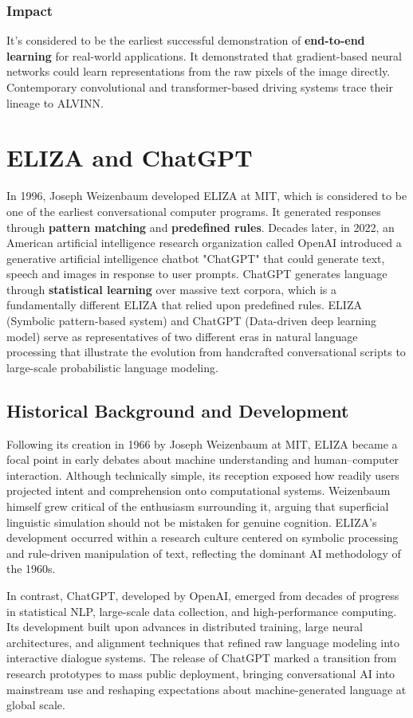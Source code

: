 \documentclass[11pt,a4paper]{report}
\begin{document}
\subsubsection{Impact}
It's considered to be the earliest successful demonstration of \textbf{end-to-end learning} for real-world applications.
It demonstrated that gradient-based neural networks could learn representations from the raw pixels of
the image directly. Contemporary convolutional and transformer-based driving systems trace their lineage to 
ALVINN.

\section{ELIZA and ChatGPT}
In 1996, Joseph Weizenbaum developed ELIZA at MIT, which is considered to be one of the earliest conversational
computer programs. It generated responses through \textbf{pattern matching} and \textbf{predefined rules}. Decades later,
in 2022, an American artificial intelligence research organization called OpenAI introduced a generative 
artificial intelligence chatbot "ChatGPT" that could generate text, speech and images in response to user prompts.
ChatGPT generates language through \textbf{statistical learning} over massive text corpora, which is a fundamentally
different ELIZA that relied upon predefined rules. ELIZA (Symbolic pattern-based system) and ChatGPT (Data-driven deep learning model) 
serve as representatives of two different eras in natural language processing that illustrate the evolution from 
handcrafted conversational scripts to large-scale probabilistic language modeling.

\subsection{Historical Background and Development}
Following its creation in 1966 by Joseph Weizenbaum at MIT, ELIZA became a focal point in early debates about machine 
understanding and human–computer interaction. Although technically simple, its reception exposed how readily users 
projected intent and comprehension onto computational systems. Weizenbaum himself grew critical of the enthusiasm 
surrounding it, arguing that superficial linguistic simulation should not be mistaken for genuine cognition. ELIZA’s 
development occurred within a research culture centered on symbolic processing and rule-driven manipulation of text, 
reflecting the dominant AI methodology of the 1960s.

In contrast, ChatGPT, developed by OpenAI, emerged from decades of progress in statistical NLP, large-scale data collection, 
and high-performance computing. Its development built upon advances in distributed training, large neural architectures, 
and alignment techniques that refined raw language modeling into interactive dialogue systems. The release of ChatGPT marked 
a transition from research prototypes to mass public deployment, bringing conversational AI into mainstream use and reshaping 
expectations about machine-generated language at global scale.
\end{document}

